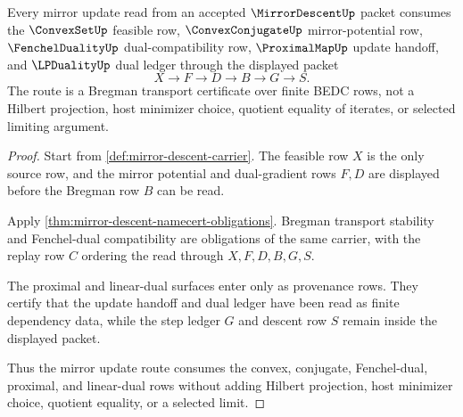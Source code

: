 \begin{theorem}
\label{thm:mirror-descent-bregman-transport-certificate}
Every mirror update read from an accepted $\MirrorDescentUp$ packet consumes the $\ConvexSetUp$ feasible row, $\ConvexConjugateUp$ mirror-potential row, $\FenchelDualityUp$ dual-compatibility row, $\ProximalMapUp$ update handoff, and $\LPDualityUp$ dual ledger through the displayed packet
$$
X \longrightarrow F \longrightarrow D \longrightarrow B \longrightarrow G \longrightarrow S .
$$
The route is a Bregman transport certificate over finite BEDC rows, not a Hilbert projection, host minimizer choice, quotient equality of iterates, or selected limiting argument.
\end{theorem}
\begin{proof}
Start from \autoref{def:mirror-descent-carrier}. The feasible row $X$ is the only source row, and the mirror potential and dual-gradient rows $F,D$ are displayed before the Bregman row $B$ can be read.

Apply \autoref{thm:mirror-descent-namecert-obligations}. Bregman transport stability and Fenchel-dual compatibility are obligations of the same carrier, with the replay row $C$ ordering the read through $X,F,D,B,G,S$.

The proximal and linear-dual surfaces enter only as provenance rows. They certify that the update handoff and dual ledger have been read as finite dependency data, while the step ledger $G$ and descent row $S$ remain inside the displayed packet.

Thus the mirror update route consumes the convex, conjugate, Fenchel-dual, proximal, and linear-dual rows without adding Hilbert projection, host minimizer choice, quotient equality, or a selected limit.
\end{proof}


\begin{closurestatus}{\MirrorDescentUp}
  \theoryclosure{\seedClosure}
  \formalstatus{\unformalizedV}
\end{closurestatus}
